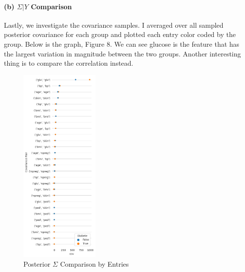 \documentclass[11pt, letterpaper]{article}
\begin{document}
\newpage
\paragraph{(b) $\Sigma|Y$ Comparison}
Lastly, we investigate the covariance samples. I averaged over all sampled posterior covariance for each group and plotted each entry color coded by the group. Below is the graph, Figure 8. We can see glucose is the feature that has the largest variation in magnitude between the two groups. Another interesting thing is to compare the correlation instead.

\begin{figure}[!h]
  \centering
  \includegraphics[width=0.35\textwidth]{3.b.png}
  \captionsetup{justification=centering}
  \caption{Posterior $\Sigma$ Comparison by Entries}
\end{figure}
\end{document}
